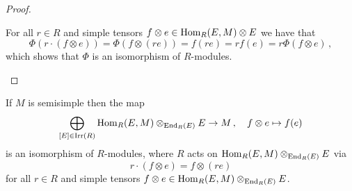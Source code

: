 \begin{proof}
\begin{enumerate}
      For all $r \in R$ and simple tensors $f \otimes e \in \operatorname{Hom}_R(E,M) \otimes E$ we have that
      \[
          \Phi(r \cdot (f \otimes e))
        = \Phi(f \otimes (re))
        = f(re)
        = r f(e)
        = r \Phi(f \otimes e) \,,
      \]
      which shows that $\Phi$ is an isomorphism of $R$-modules.
    \qedhere
  \end{enumerate}
\end{proof}


\begin{corollary}
  If $M$ is semisimple then the map
  \[
            \bigoplus_{[E] \in \operatorname{Irr}(R)} \operatorname{Hom}_R(E, M) \otimes_{\operatorname{End}_R(E)} E
    \to     M \,,
    \quad   f \otimes e
    \mapsto f(e)
  \]
  is an isomorphism of $R$-modules, where $R$ acts on $\operatorname{Hom}_R(E, M) \otimes_{\operatorname{End}_R(E)} E$ via
  \[
      r \cdot (f \otimes e)
    = f \otimes (re)
  \]
  for all $r \in R$ and simple tensors $f \otimes e \in \operatorname{Hom}_R(E, M) \otimes_{\operatorname{End}_R(E)} E$.
\end{corollary}




